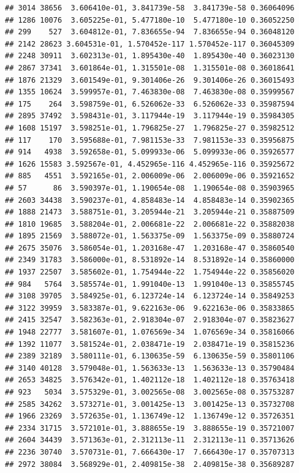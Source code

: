 \documentclass[
]{article}
\begin{document}
\begin{verbatim}
## 3014 38656  3.606410e-01, 3.841739e-58  3.841739e-58 0.36064096
## 1286 10076  3.605225e-01, 5.477180e-10  5.477180e-10 0.36052250
## 299    527  3.604812e-01, 7.836655e-94  7.836655e-94 0.36048120
## 2142 28623 3.604531e-01, 1.570452e-117 1.570452e-117 0.36045309
## 2248 30911  3.602313e-01, 1.895430e-40  1.895430e-40 0.36023130
## 2867 37341  3.601864e-01, 1.315501e-08  1.315501e-08 0.36018641
## 1876 21329  3.601549e-01, 9.301406e-26  9.301406e-26 0.36015493
## 1355 10624  3.599957e-01, 7.463830e-08  7.463830e-08 0.35999567
## 175    264  3.598759e-01, 6.526062e-33  6.526062e-33 0.35987594
## 2895 37492  3.598431e-01, 3.117944e-19  3.117944e-19 0.35984305
## 1608 15197  3.598251e-01, 1.796825e-27  1.796825e-27 0.35982512
## 117    170  3.595688e-01, 7.981153e-33  7.981153e-33 0.35956875
## 914   4938  3.592658e-01, 5.099933e-06  5.099933e-06 0.35926577
## 1626 15583 3.592567e-01, 4.452965e-116 4.452965e-116 0.35925672
## 885   4551  3.592165e-01, 2.006009e-06  2.006009e-06 0.35921652
## 57      86  3.590397e-01, 1.190654e-08  1.190654e-08 0.35903965
## 2603 34438  3.590237e-01, 4.858483e-14  4.858483e-14 0.35902365
## 1888 21473  3.588751e-01, 3.205944e-21  3.205944e-21 0.35887509
## 1810 19685  3.588204e-01, 2.006681e-22  2.006681e-22 0.35882038
## 1895 21569  3.588072e-01, 1.563375e-09  1.563375e-09 0.35880724
## 2675 35076  3.586054e-01, 1.203168e-47  1.203168e-47 0.35860540
## 2349 31783  3.586000e-01, 8.531892e-14  8.531892e-14 0.35860000
## 1937 22507  3.585602e-01, 1.754944e-22  1.754944e-22 0.35856020
## 984   5764  3.585574e-01, 1.991040e-13  1.991040e-13 0.35855745
## 3108 39705  3.584925e-01, 6.123724e-14  6.123724e-14 0.35849253
## 3122 39959  3.583387e-01, 9.622163e-06  9.622163e-06 0.35833865
## 2415 32547  3.582363e-01, 2.918304e-07  2.918304e-07 0.35823627
## 1948 22777  3.581607e-01, 1.076569e-34  1.076569e-34 0.35816066
## 1392 11077  3.581524e-01, 2.038471e-19  2.038471e-19 0.35815236
## 2389 32189  3.580111e-01, 6.130635e-59  6.130635e-59 0.35801106
## 3140 40128  3.579048e-01, 1.563633e-13  1.563633e-13 0.35790484
## 2653 34825  3.576342e-01, 1.402112e-18  1.402112e-18 0.35763418
## 923   5034  3.575329e-01, 3.002565e-08  3.002565e-08 0.35753287
## 2585 34262  3.573271e-01, 3.001425e-13  3.001425e-13 0.35732708
## 1966 23269  3.572635e-01, 1.136749e-12  1.136749e-12 0.35726351
## 2334 31715  3.572101e-01, 3.888655e-19  3.888655e-19 0.35721007
## 2604 34439  3.571363e-01, 2.312113e-11  2.312113e-11 0.35713626
## 2236 30740  3.570731e-01, 7.666430e-17  7.666430e-17 0.35707313
## 2972 38084  3.568929e-01, 2.409815e-38  2.409815e-38 0.35689287

\end{verbatim}
\end{document}
